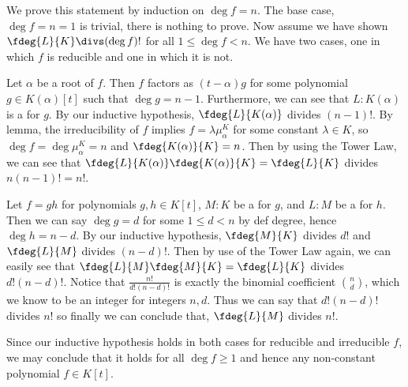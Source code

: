 \documentclass{article}
\begin{document}
\begin{solution}
We prove this statement by induction on \( \deg f = n \).
The base case, \( \deg f = n = 1 \) is trivial, there is nothing to prove.
Now assume we have shown \( \fdeg{L}{K}\divs (\deg f)! \) for all \( 1\leq\deg f<n \).
We have two cases, one in which \( f \) is reducible and one in which it is not.
\begin{subproof}
Let \( \alpha \) be a root of \( f \).
Then \( f \) factors as \( (t-\alpha)g \) for some polynomial \( g\in K(\alpha)[t] \) such that \( \deg g = n-1 \).
Furthermore, we can see that \( L:K(\alpha) \) is a \sfe for \( g \).
By our inductive hypothesis, \( \fdeg{L}{K(\alpha)} \) divides \( (n-1)! \).
By lemma, the irreducibility of \( f \) implies \( f=\lambda\mu_\alpha^{K} \) for some constant \( \lambda\in K \), so \( \deg f = \deg \mu_\alpha^K = n \) and \( \fdeg{K(\alpha)}{K}=n \).
Then by using the Tower Law, we can see that \( \fdeg{L}{K(\alpha)}\fdeg{K(\alpha)}{K} = \fdeg{L}{K} \) divides \( n(n-1)! = n! \).
\end{subproof}
\begin{subproof}
  Let \( f = gh \) for polynomials \( g,h\in K[t] \),  \( M:K \) be a \sfe for \( g \), and \( L:M \) be a \sfe for \( h \).
  Then we can say \( \deg g = d \) for some \( 1\leq d < n \) by def degree, hence \( \deg h = n-d \).
  By our inductive hypothesis, \( \fdeg{M}{K} \) divides \( d! \) and \( \fdeg{L}{M} \) divides \( (n-d)! \).
  Then by use of the Tower Law again, we can easily see that \( \fdeg{L}{M}\fdeg{M}{K} = \fdeg{L}{K} \) divides \( d!(n-d)! \).
  Notice that \( \frac{n!}{d!(n-d)!} \) is exactly the binomial coefficient \( \binom{n}{d} \), which we know to be an integer for integers \( n,d \).
  Thus we can say that \( d!(n-d)! \) divides \( n! \) so finally we can conclude that, \( \fdeg{L}{M} \) divides \( n! \).
\end{subproof}
Since our inductive hypothesis holds in both cases for reducible and irreducible \( f \), we may conclude that it holds for all \( \deg f \geq 1 \) and hence any non-constant polynomial \( f\in K[t] \).
\end{solution}
\end{document}

